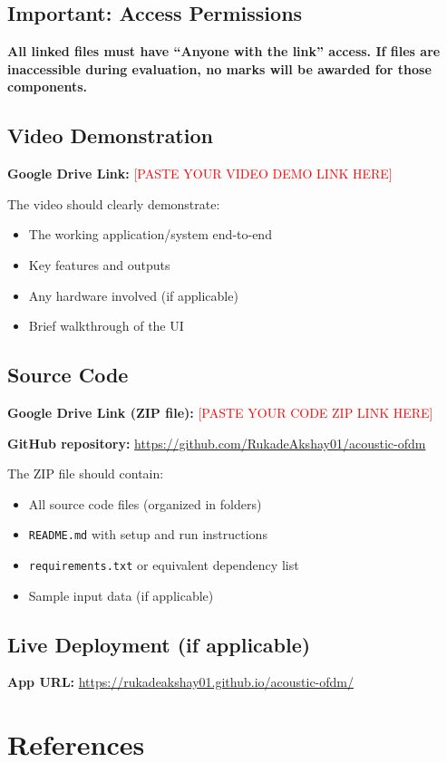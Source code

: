 \documentclass[11pt,a4paper]{report}
\newcommand{\fillin}[1]{\textcolor{red}{[#1]}}
\begin{document}
\section*{Important: Access Permissions}
\textbf{All linked files must have ``Anyone with the link'' access. If files are inaccessible during evaluation, no marks will be awarded for those components.}

\section{Video Demonstration}
\textbf{Google Drive Link:} \fillin{PASTE YOUR VIDEO DEMO LINK HERE}

The video should clearly demonstrate:
\begin{itemize}
    \item The working application/system end-to-end
    \item Key features and outputs
    \item Any hardware involved (if applicable)
    \item Brief walkthrough of the UI
\end{itemize}

\section{Source Code}
\textbf{Google Drive Link (ZIP file):} \fillin{PASTE YOUR CODE ZIP LINK HERE}

\textbf{GitHub repository:} \url{https://github.com/RukadeAkshay01/acoustic-ofdm}

The ZIP file should contain:
\begin{itemize}
    \item All source code files (organized in folders)
    \item \texttt{README.md} with setup and run instructions
    \item \texttt{requirements.txt} or equivalent dependency list
    \item Sample input data (if applicable)
\end{itemize}

\section{Live Deployment (if applicable)}
\textbf{App URL:} \url{https://rukadeakshay01.github.io/acoustic-ofdm/}

\chapter*{References}
\end{document}
